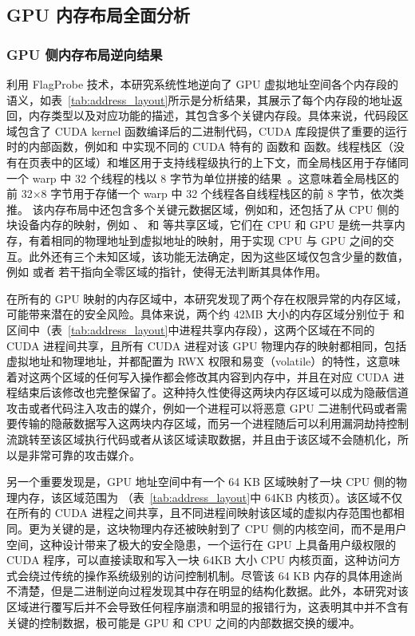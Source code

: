 \subsection{GPU 内存布局全面分析}
\subsubsection{GPU 侧内存布局逆向结果}
利用 FlagProbe 技术，本研究系统性地逆向了 GPU 虚拟地址空间各个内存段的语义，如表~\ref{tab:address_layout}所示是分析结果，其展示了每个内存段的地址返回，内存类型以及对应功能的描述，其包含多个关键内存段。具体来说，代码段区域包含了 CUDA kernel 函数编译后的二进制代码，CUDA 库段提供了重要的运行时的内部函数，例如和  中实现不同的 CUDA 特有的  函数和  函数。线程栈区（没有在页表中的区域）和堆区用于支持线程级执行的上下文，而全局栈区用于存储同一个 warp 中 32 个线程的栈以 8 字节为单位拼接的结果~\cite{diff_local_global}。这意味着全局栈区的前 32×8 字节用于存储一个 warp 中 32 个线程各自线程栈区的前 8 字节，依次类推。
该内存布局中还包含多个关键元数据区域，例如和，还包括了从 CPU 侧的块设备内存的映射，例如 、 和  等共享区域，它们在 CPU 和 GPU 是统一共享内存，有着相同的物理地址到虚拟地址的映射，用于实现 CPU 与 GPU 之间的交互。此外还有三个未知区域，该功能无法确定，因为这些区域仅包含少量的数值，例如  或者 若干指向全零区域的指针，使得无法判断其具体作用。

在所有的 GPU 映射的内存区域中，本研究发现了两个存在权限异常的内存区域，可能带来潜在的安全风险。具体来说，两个约 42MB 大小的内存区域分别位于  和  区间中（表~\ref{tab:address_layout}中进程共享内存段），这两个区域在不同的 CUDA 进程间共享，且所有 CUDA 进程对该 GPU 物理内存的映射都相同，包括虚拟地址和物理地址，并都配置为 RWX 权限和易变（volatile）的特性，这意味着对这两个区域的任何写入操作都会修改其内容到内存中，并且在对应 CUDA 进程结束后该修改也完整保留了。这种持久性使得这两块内存区域可以成为隐蔽信道攻击或者代码注入攻击的媒介，例如一个进程可以将恶意 GPU 二进制代码或者需要传输的隐蔽数据写入这两块内存区域，而另一个进程随后可以利用漏洞劫持控制流跳转至该区域执行代码或者从该区域读取数据，并且由于该区域不会随机化，所以是非常可靠的攻击媒介。

另一个重要发现是，GPU 地址空间中有一个 64 KB 区域映射了一块 CPU 侧的物理内存，该区域范围为 （表~\ref{tab:address_layout}中 64KB 内核页）。该区域不仅在所有的 CUDA 进程之间共享，且不同进程间映射该区域的虚拟内存范围也都相同。更为关键的是，这块物理内存还被映射到了 CPU 侧的内核空间，而不是用户空间，这种设计带来了极大的安全隐患，一个运行在 GPU 上具备用户级权限的 CUDA 程序，可以直接读取和写入一块 64KB 大小 CPU 内核页面，这种访问方式会绕过传统的操作系统级别的访问控制机制。尽管该 64 KB 内存的具体用途尚不清楚，但是二进制逆向过程发现其中存在明显的结构化数据。此外，本研究对该区域进行覆写后并不会导致任何程序崩溃和明显的报错行为，这表明其中并不含有关键的控制数据，极可能是 GPU 和 CPU 之间的内部数据交换的缓冲。

